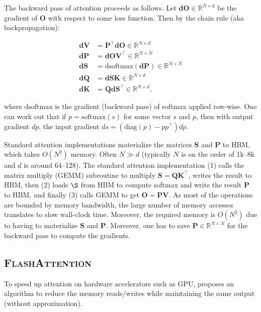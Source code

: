 The backward pass of attention proceeds as follows. Let $\mathbf{dO} \in \mathbb{R}^{N \times d}$ be the gradient of $\mathbf{O}$ with respect to some loss function. Then by the chain rule (aka backpropagation):

\begin{align*}
  \mathbf{dV} &= \mathbf{P}^\top \mathbf{dO} \in \mathbb{R}^{N \times d} \\
  \mathbf{dP} &= \mathbf{dO} \mathbf{V}^\top \in \mathbb{R}^{N \times N} \\
  \mathbf{dS} &= \mathrm{dsoftmax} (\mathbf{dP}) \in \mathbb{R}^{N \times N} \\
  \mathbf{dQ} &= \mathbf{dS} \mathbf{K} \in \mathbb{R}^{N \times d} \\
  \mathbf{dK} &= \mathbf{Q} \mathbf{dS}^\top \in \mathbb{R}^{N \times d},
\end{align*}

where $\mathrm{dsoftmax}$ is the gradient (backward pass) of softmax applied row-wise. One can work out that if $p = \mathrm{softmax}(s)$ for some vector $s$ and $p$, then with output gradient $dp$, the input gradient $ds = (\mathrm{diag}(p) - p p^\top)dp$.

Standard attention implementations materialize the matrices $\mathbf{S}$ and $\mathbf{P}$ to HBM, which takes $O(N^2)$ memory. Often $N \gg d$ (typically $N$ is on the order of 1k--8k and $d$ is around 64--128). The standard attention implementation (1) calls the matrix multiply (GEMM) subroutine to multiply $\mathbf{S} = \mathbf{Q} \mathbf{K}^\top$, writes the result to HBM, then (2) loads $\S$ from HBM to compute softmax and write the result $\mathbf{P}$ to HBM, and finally (3) calls GEMM to get $\mathbf{O} = \mathbf{P} \mathbf{V}$.
As most of the operations are bounded by memory bandwidth, the large number of memory accesses translates to slow wall-clock time. Moreover, the required memory is $O(N^2)$ due to having to materialize $\mathbf{S}$ and
$\mathbf{P}$.
Moreover, one has to save $\mathbf{P} \in \mathbb{R}^{N \times N}$ for the backward pass to compute the gradients.

\subsection{\textsc{FlashAttention}}
\label{subsec:flashv1}

To speed up attention on hardware accelerators such as GPU, \citep{dao2022flashattention} proposes an algorithm to reduce the memory reads/writes while maintaining the same output (without approximation).

